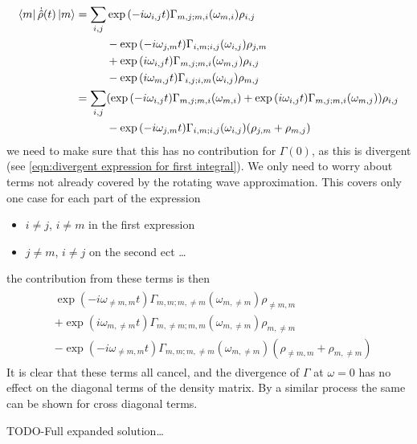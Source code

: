 \begin{align}
  \bra{m}\dot{\hat{\rho}}(t) \ket{m} & = \begin{aligned}[t]
    \sum_{i,j} &
    \exp{(-i\omega_{i,j} t)}
    \Gamma_{m,j;m, i}(\omega_{m,i})
    \rho_{i,j}   \\
               &
    -\exp{(-i\omega_{j,m} t)}
    \Gamma_{i,m;i, j}(\omega_{i,j})
    \rho_{j, m}  \\
               &
    +\exp{(i\omega_{i,j} t)}
    \Gamma_{m,j; m, i}(\omega_{m,j})
    \rho_{i, j}  \\
               &
    -\exp{(i\omega_{m,j} t)}
    \Gamma_{i,j; i, m}(\omega_{i,j})
    \rho_{m, j}
  \end{aligned} \\
                                     & = \begin{aligned}[t]
    \sum_{i,j} &
    (\exp{(-i\omega_{i,j} t)}
    \Gamma_{m,j;m, i}(\omega_{m,i})
    +\exp{(i\omega_{i,j} t)}
    \Gamma_{m,j; m, i}(\omega_{m,j})
    )\rho_{i,j}                 \\
               &
    -\exp{(-i\omega_{j,m} t)}
    \Gamma_{i,m;i, j}(\omega_{i,j})
    (\rho_{j, m} + \rho_{m, j}) \\
  \end{aligned}
\end{align}
we need to make sure that this
has no contribution for
\(\Gamma(0)\), as this is divergent
(see \cref{eqn:divergent expression for first integral}).
We only need
to worry about terms not already
covered by the rotating wave approximation.
This covers only one case for each part of
the expression
\begin{itemize}
  \item \(i \neq j\), \(i \neq m\) in the
        first expression
  \item \(j\neq m\), \(i \neq j\) on the
        second ect \ldots
\end{itemize}
the contribution from these
terms is then
\begin{align}
  \begin{aligned}
     & \exp{(-i\omega_{\neq m,m} t)}
    \Gamma_{m,m;m, \neq m}(\omega_{m,\neq m})
    \rho_{\neq m,m}                  \\
     &
    +\exp{(i\omega_{m,\neq m} t)}
    \Gamma_{m,\neq m; m, m}(\omega_{m,\neq m})
    \rho_{m,\neq m}                  \\
     &
    -\exp{(-i\omega_{\neq m,m} t)}
    \Gamma_{m,m;m, \neq m}(\omega_{m,\neq m})
    (\rho_{\neq m, m} + \rho_{m, \neq m})
  \end{aligned}
\end{align}
It is clear that these terms all cancel,
and the divergence of \(\Gamma \) at \(\omega = 0\)
has no effect on the diagonal terms of the
density matrix. By a similar process the same can
be shown for cross diagonal terms.

TODO-Full expanded solution\ldots